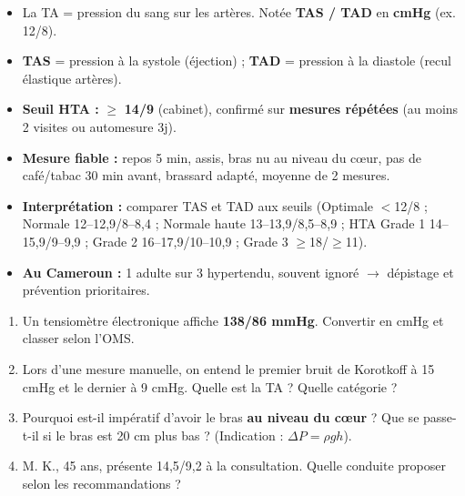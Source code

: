 \documentclass[11pt]{article}
\begin{document}
\begin{aretenir}
\begin{itemize}
    \item La TA = pression du sang sur les artères. Notée \textbf{TAS / TAD} en \textbf{cmHg} (ex. 12/8).
    \item \textbf{TAS} = pression à la systole (éjection) ; \textbf{TAD} = pression à la diastole (recul élastique artères).
    \item \textbf{Seuil HTA :} $\ge$ \textbf{14/9} (cabinet), confirmé sur \textbf{mesures répétées} (au moins 2 visites ou automesure 3j).
    \item \textbf{Mesure fiable :} repos 5 min, assis, bras nu au niveau du cœur, pas de café/tabac 30 min avant, brassard adapté, moyenne de 2 mesures.
    \item \textbf{Interprétation :} comparer TAS et TAD aux seuils (Optimale $<$12/8 ; Normale 12--12,9/8--8,4 ; Normale haute 13--13,9/8,5--8,9 ; HTA Grade 1 14--15,9/9--9,9 ; Grade 2 16--17,9/10--10,9 ; Grade 3 $\ge$18/$\ge$11).
    \item \textbf{Au Cameroun :} 1 adulte sur 3 hypertendu, souvent ignoré $\rightarrow$ dépistage et prévention prioritaires.
\end{itemize}
\end{aretenir}

\begin{exercice}
\begin{enumerate}
    \item Un tensiomètre électronique affiche \textbf{138/86 mmHg}. Convertir en cmHg et classer selon l'OMS.
    \item Lors d'une mesure manuelle, on entend le premier bruit de Korotkoff à 15 cmHg et le dernier à 9 cmHg. Quelle est la TA ? Quelle catégorie ?
    \item Pourquoi est-il impératif d'avoir le bras \textbf{au niveau du cœur} ? Que se passe-t-il si le bras est 20 cm plus bas ? (Indication : $\Delta P = \rho g h$).
    \item M. K., 45 ans, présente 14,5/9,2 à la consultation. Quelle conduite proposer selon les recommandations ?
\end{enumerate}
\end{exercice}
\end{document}
